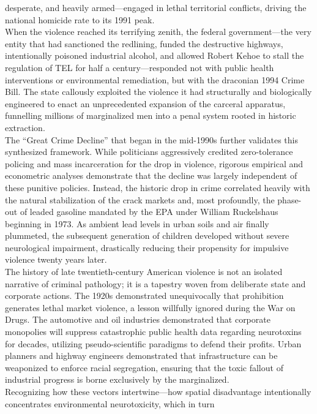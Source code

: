 \documentclass[
]{article}
\begin{document}
desperate, and heavily armed---engaged in lethal territorial conflicts,
driving the national homicide rate to its 1991 peak.\\
When the violence reached its terrifying zenith, the federal
government---the very entity that had sanctioned the redlining, funded
the destructive highways, intentionally poisoned industrial alcohol, and
allowed Robert Kehoe to stall the regulation of TEL for half a
century---responded not with public health interventions or
environmental remediation, but with the draconian 1994 Crime Bill. The
state callously exploited the violence it had structurally and
biologically engineered to enact an unprecedented expansion of the
carceral apparatus, funnelling millions of marginalized men into a penal
system rooted in historic extraction.\\
The ``Great Crime Decline'' that began in the mid-1990s further
validates this synthesized framework. While politicians aggressively
credited zero-tolerance policing and mass incarceration for the drop in
violence, rigorous empirical and econometric analyses demonstrate that
the decline was largely independent of these punitive policies. Instead,
the historic drop in crime correlated heavily with the natural
stabilization of the crack markets and, most profoundly, the phase-out
of leaded gasoline mandated by the EPA under William Ruckelshaus
beginning in 1973. As ambient lead levels in urban soils and air finally
plummeted, the subsequent generation of children developed without
severe neurological impairment, drastically reducing their propensity
for impulsive violence twenty years later.\\
The history of late twentieth-century American violence is not an
isolated narrative of criminal pathology; it is a tapestry woven from
deliberate state and corporate actions. The 1920s demonstrated
unequivocally that prohibition generates lethal market violence, a
lesson willfully ignored during the War on Drugs. The automotive and oil
industries demonstrated that corporate monopolies will suppress
catastrophic public health data regarding neurotoxins for decades,
utilizing pseudo-scientific paradigms to defend their profits. Urban
planners and highway engineers demonstrated that infrastructure can be
weaponized to enforce racial segregation, ensuring that the toxic
fallout of industrial progress is borne exclusively by the
marginalized.\\
Recognizing how these vectors intertwine---how spatial disadvantage
intentionally concentrates environmental neurotoxicity, which in turn
\end{document}
